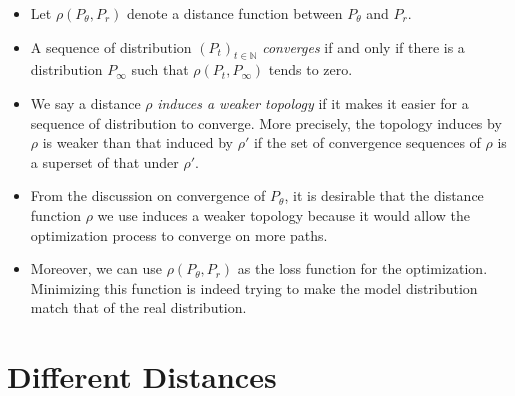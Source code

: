 \documentclass[10pt]{article}
\begin{document}
\begin{itemize}
  	\item Let $\rho(P_\theta, P_r)$ denote a distance function between $P_\theta$ and $P_r$.

  	\item A sequence of distribution $(P_t)_{t \in \mathbb{N}}$ \emph{converges} if and only if there is a distribution $P_\infty$ such that $\rho(P_t, P_\infty)$ tends to zero.

  	\item We say a distance $\rho$ \emph{induces a weaker topology} if it makes it easier for a sequence of distribution to converge. More precisely, the topology induces by $\rho$ is weaker than that induced by $\rho'$ if the set of convergence sequences of $\rho$ is a superset of that under $\rho'$.

  	\item From the discussion on convergence of $P_\theta$, it is desirable that the distance function $\rho$ we use induces a weaker topology because it would allow the optimization process to converge on more paths.

  	\item Moreover, we can use $\rho(P_\theta, P_r)$ as the loss function for the optimization. Minimizing this function is indeed trying to make the model distribution match that of the real distribution. 
  \end{itemize}

  \section{Different Distances}
\end{document}
